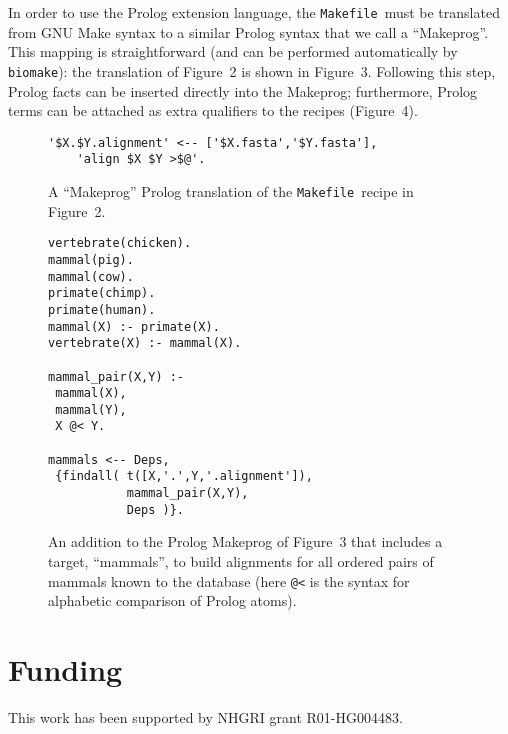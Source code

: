 \documentclass{bioinfo}
\newcommand\Makefile{{\tt Makefile}}
\newcommand\biomake{{\tt biomake}}
\begin{document}
In order to use the Prolog extension language, the \Makefile\ must be translated from GNU Make syntax to a similar Prolog syntax that we call a ``Makeprog''.
This mapping is straightforward (and can be performed automatically by \biomake): the translation of Figure~2 is shown in Figure~3.
Following this step, Prolog facts can be inserted directly into the Makeprog; furthermore, Prolog terms can be attached as extra qualifiers to the recipes (Figure~4).
\begin{figure}[H]
\begin{Verbatim}[frame=single]
'$X.$Y.alignment' <-- ['$X.fasta','$Y.fasta'],
    'align $X $Y >$@'.
\end{Verbatim}
\caption{
  A ``Makeprog'' Prolog translation of the \Makefile\ recipe in Figure~2.
}
\end{figure}

\begin{figure}[H]
\begin{Verbatim}[frame=single]
vertebrate(chicken).
mammal(pig).
mammal(cow).
primate(chimp).
primate(human).
mammal(X) :- primate(X).
vertebrate(X) :- mammal(X).

mammal_pair(X,Y) :-
 mammal(X),
 mammal(Y),
 X @< Y.

mammals <-- Deps, 
 {findall( t([X,'.',Y,'.alignment']),
           mammal_pair(X,Y),
           Deps )}.
\end{Verbatim}
\caption{
  An addition to the Prolog Makeprog of Figure~3 that includes a target, ``mammals'', to build alignments
  for all ordered pairs of mammals known to the database (here {\tt @<} is the syntax for alphabetic comparison of Prolog atoms).
}
\end{figure}

%

\section*{Funding}

This work has been supported by NHGRI grant R01-HG004483.


%
%
%
%
%
%
%
%



\end{document}
